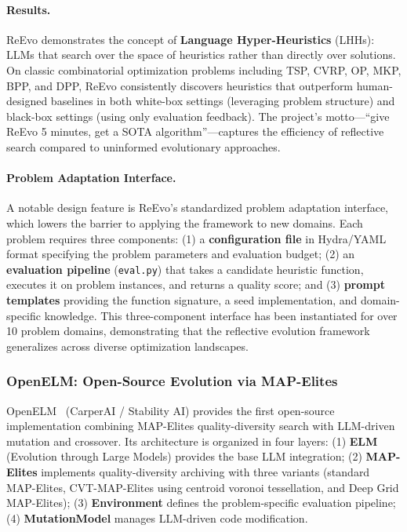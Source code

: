 \paragraph{Results.}
ReEvo demonstrates the concept of \textbf{Language Hyper-Heuristics} (LHHs): LLMs that search over the space of heuristics rather than directly over solutions. On classic combinatorial optimization problems including TSP, CVRP, OP, MKP, BPP, and DPP, ReEvo consistently discovers heuristics that outperform human-designed baselines in both white-box settings (leveraging problem structure) and black-box settings (using only evaluation feedback). The project's motto---``give ReEvo 5 minutes, get a SOTA algorithm''---captures the efficiency of reflective search compared to uninformed evolutionary approaches.

\paragraph{Problem Adaptation Interface.}
A notable design feature is ReEvo's standardized problem adaptation interface, which lowers the barrier to applying the framework to new domains. Each problem requires three components: (1) a \textbf{configuration file} in Hydra/YAML format specifying the problem parameters and evaluation budget; (2) an \textbf{evaluation pipeline} (\texttt{eval.py}) that takes a candidate heuristic function, executes it on problem instances, and returns a quality score; and (3) \textbf{prompt templates} providing the function signature, a seed implementation, and domain-specific knowledge. This three-component interface has been instantiated for over 10 problem domains, demonstrating that the reflective evolution framework generalizes across diverse optimization landscapes.


\subsubsection{OpenELM: Open-Source Evolution via MAP-Elites}

OpenELM~\citep{carperai2023openelm} (CarperAI / Stability AI) provides the first open-source implementation combining MAP-Elites quality-diversity search with LLM-driven mutation and crossover. Its architecture is organized in four layers: (1) \textbf{ELM} (Evolution through Large Models) provides the base LLM integration; (2) \textbf{MAP-Elites} implements quality-diversity archiving with three variants (standard MAP-Elites, CVT-MAP-Elites using centroid voronoi tessellation, and Deep Grid MAP-Elites); (3) \textbf{Environment} defines the problem-specific evaluation pipeline; (4) \textbf{MutationModel} manages LLM-driven code modification.

